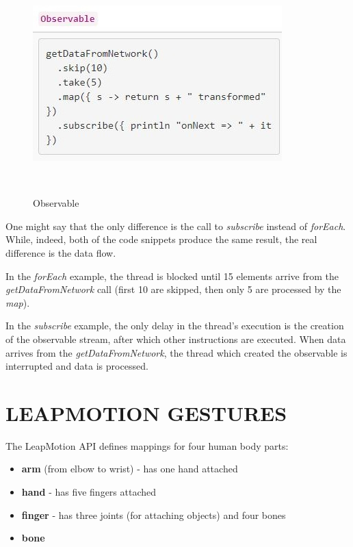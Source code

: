 \documentclass{sigchi}
\def\leap{LeapMotion}
\begin{document}
\begin{figure}[h]
  \centering
  \includegraphics[width=0.9\columnwidth]{figures/RX_observable}
  \caption{Observable}~\label{fig:figure4}
\end{figure}

One might say that the only difference is the call to \textit{subscribe} instead of \textit{forEach}. While, indeed, both of the code snippets produce the same result, the real difference is the data flow.


In the \textit{forEach} example, the thread is blocked until 15 elements arrive from the \textit{getDataFromNetwork} call (first 10 are skipped, then only 5 are processed by the \textit{map}).


In the \textit{subscribe} example, the only delay in the thread's execution is the creation of the observable stream, after which other instructions are executed. When data arrives from the \textit{getDataFromNetwork}, the thread which created the observable is interrupted and data is processed.

\section{LEAPMOTION GESTURES}

The \leap{} API defines mappings for four human body parts:

\begin{itemize}
  \item \textbf{arm} (from elbow to wrist) - has one hand attached
  \item \textbf{hand} - has five fingers attached
  \item \textbf{finger} - has three joints (for attaching objects) and four bones
  \item \textbf{bone}
\end{itemize}
\end{document}
